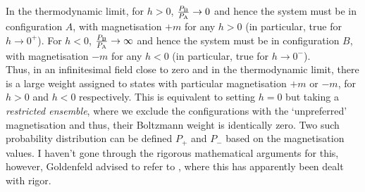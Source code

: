In the thermodynamic limit, for $h>0$, $\frac{P_{\text{\tiny B}}}{P_{\text{\tiny A}}} \to 0$ and hence the system must be in configuration $A$, with magnetisation $+m$ for any $h>0$ (in particular, true for $h\to 0^+$). For $h<0$, $\frac{P_{\text{\tiny B}}}{P_{\text{\tiny A}}}\to \infty $ and hence the system must be in configuration $B$, with magnetisation $-m$ for any $h<0$ (in particular, true for $h\to 0^-$).\\[0.2cm] Thus, in an infinitesimal field close to zero and in the thermodynamic limit, there is a large weight assigned to states with particular magnetisation $+m$ or $-m$, for $h>0$ and $h<0$ respectively. This is equivalent to setting $h=0$ but taking a \textit{restricted ensemble}, where we exclude the configurations with the `unpreferred' magnetisation and thus, their Boltzmann weight is identically zero. Two such probability distribution can be defined $P_+$ and $P_-$ based on the magnetisation values. I haven't gone through the rigorous mathematical arguments for this, however, Goldenfeld advised to refer to \cite{Glimm}, where this has apparently been dealt with rigor.